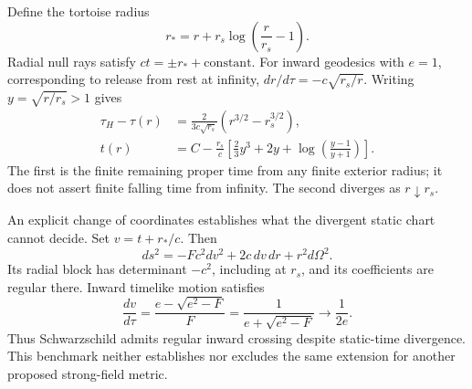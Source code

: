 \documentclass[10pt,twocolumn,letterpaper]{article}
\begin{document}
Define the tortoise radius
\begin{equation}
 r_*=r+r_s\log\left(\frac r{r_s}-1\right).
\end{equation}
Radial null rays satisfy $ct=\pm r_*+\mathrm{constant}$.
For inward geodesics with $e=1$, corresponding to release from rest at
infinity, $dr/d\tau=-c\sqrt{r_s/r}$. Writing $y=\sqrt{r/r_s}>1$ gives
\begin{align}
 \tau_H-\tau(r)&=\frac{2}{3c\sqrt{r_s}}
           \left(r^{3/2}-r_s^{3/2}\right),\\
 t(r)&=C-\frac{r_s}{c}\left[
      \frac23 y^3+2y+\log\left(\frac{y-1}{y+1}\right)\right].
 \label{eq:ch5-exact-eone}
\end{align}
The first is the finite remaining proper time from any finite exterior
radius; it does not assert finite falling time from infinity.
The second diverges as $r\downarrow r_s$.

An explicit change of coordinates establishes what the divergent static
chart cannot decide. Set $v=t+r_*/c$. Then
\begin{equation}
 ds^2=-F c^2dv^2+2c\,dv\,dr+r^2d\Omega^2.
 \label{eq:ch5-ingoing-regular}
\end{equation}
Its radial block has determinant $-c^2$, including at $r_s$, and its
coefficients are regular there. Inward timelike motion satisfies
\begin{equation}
 \frac{dv}{d\tau}
 =\frac{e-\sqrt{e^2-F}}F
 =\frac1{e+\sqrt{e^2-F}}\longrightarrow\frac1{2e}.
\end{equation}
Thus Schwarzschild admits regular inward crossing despite static-time
divergence. This benchmark neither establishes nor excludes the same
extension for another proposed strong-field metric.
\end{document}

